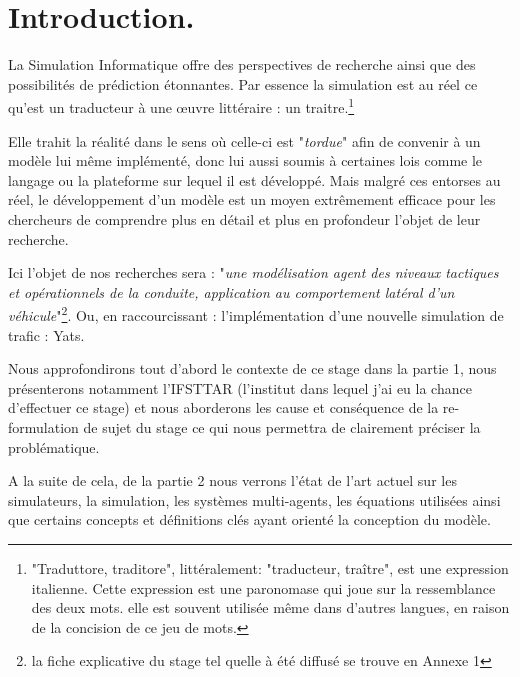 \documentclass[a4paper,11pt]{article}
\begin{document}
\newpage

\newpage
\tableofcontents
\newpage

\section*{Introduction.}

La Simulation Informatique offre des perspectives de recherche ainsi que des possibilités de prédiction étonnantes. Par essence la simulation est au réel ce qu'est un traducteur à une \oe{}uvre littéraire : un traitre.\footnote{"Traduttore, traditore", littéralement: "traducteur, traître", est une expression italienne. Cette expression est une paronomase qui joue sur la ressemblance des deux mots. elle est souvent utilisée même dans d’autres langues, en raison de la concision de ce jeu de mots.}

Elle trahit la réalité dans le sens où celle-ci est "\textit{tordue}" afin de convenir à un modèle lui même implémenté, donc lui aussi soumis à certaines lois comme le langage ou la plateforme sur lequel il est développé. Mais malgré ces entorses au réel, le développement d'un modèle est un moyen extrêmement efficace pour les chercheurs de comprendre plus en détail et plus en profondeur l'objet de leur recherche. 

Ici l'objet de nos recherches sera : "\textit{une modélisation agent des niveaux tactiques et opérationnels de la conduite, application au comportement latéral d'un véhicule}"\footnote{la fiche explicative du stage tel quelle à été diffusé se trouve en Annexe 1}. Ou, en raccourcissant : l'implémentation d'une nouvelle simulation de trafic : Yats. 

Nous approfondirons tout d'abord le contexte de ce stage dans la partie 1, nous présenterons notamment l'IFSTTAR (l'institut dans lequel j'ai eu la chance d'effectuer ce stage) et nous aborderons les cause et conséquence de la re-formulation de sujet du stage ce qui nous permettra de clairement préciser la problématique.

A la suite de cela, de la partie 2 nous verrons l'état de l'art actuel sur les simulateurs, la simulation, les systèmes multi-agents, les équations utilisées ainsi que certains concepts et définitions clés ayant orienté la conception du modèle.
\end{document}
